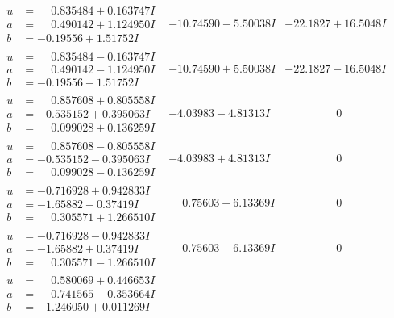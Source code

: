 \documentclass[1p]{elsarticle_modified}
\theoremstyle{definition}
\begin{document}
$$\begin{array}{c|c|c}
\begin{aligned}
u &= \phantom{-}0.835484 + 0.163747 I \\
a &= \phantom{-}0.490142 + 1.124950 I \\
b &= -0.19556 + 1.51752 I\end{aligned}
 & -10.74590 - 5.50038 I & -22.1827 + 16.5048 I \\ \hline\begin{aligned}
u &= \phantom{-}0.835484 - 0.163747 I \\
a &= \phantom{-}0.490142 - 1.124950 I \\
b &= -0.19556 - 1.51752 I\end{aligned}
 & -10.74590 + 5.50038 I & -22.1827 - 16.5048 I \\ \hline\begin{aligned}
u &= \phantom{-}0.857608 + 0.805558 I \\
a &= -0.535152 + 0.395063 I \\
b &= \phantom{-}0.099028 + 0.136259 I\end{aligned}
 & -4.03983 - 4.81313 I & \phantom{-0.000000 } 0 \\ \hline\begin{aligned}
u &= \phantom{-}0.857608 - 0.805558 I \\
a &= -0.535152 - 0.395063 I \\
b &= \phantom{-}0.099028 - 0.136259 I\end{aligned}
 & -4.03983 + 4.81313 I & \phantom{-0.000000 } 0 \\ \hline\begin{aligned}
u &= -0.716928 + 0.942833 I \\
a &= -1.65882 - 0.37419 I \\
b &= \phantom{-}0.305571 + 1.266510 I\end{aligned}
 & \phantom{-}0.75603 + 6.13369 I & \phantom{-0.000000 } 0 \\ \hline\begin{aligned}
u &= -0.716928 - 0.942833 I \\
a &= -1.65882 + 0.37419 I \\
b &= \phantom{-}0.305571 - 1.266510 I\end{aligned}
 & \phantom{-}0.75603 - 6.13369 I & \phantom{-0.000000 } 0 \\ \hline\begin{aligned}
u &= \phantom{-}0.580069 + 0.446653 I \\
a &= \phantom{-}0.741565 - 0.353664 I \\
b &= -1.246050 + 0.011269 I\end{aligned}

\end{array}$$
\end{document}
